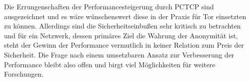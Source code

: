 \documentclass[fleqn,envcountsame,runningheads,10pt,a4paper]{llncs}
\begin{document}
Die Errungenschaften der Performancesteigerung durch PCTCP sind ausgezeichnet 
und es wäre wünschenswert diese in der Praxis für Tor einsetzten zu können. 
Allerdings sind die Sicherheitseinbußen sehr kritisch zu betrachten und für ein 
Netzwerk, dessen primäres Ziel die Wahrung der Anonymität ist, steht der Gewinn 
der Performance vermutlich in keiner Relation zum Preis der Sicherheit. Die 
Frage nach einem umsetzbaren Ansatz zur Verbesserung der Performance bleibt also 
offen und birgt viel Möglichkeiten für weitere Forschungen.



\end{document}
